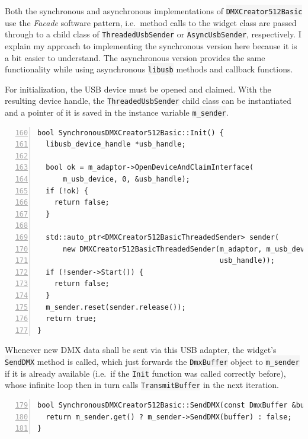 Both the synchronous and asynchronous implementations of
\colorbox{WhiteSmoke}{\lstinline!DMXCreator512Basic!} use the \emph{Facade} software pattern,
i.e.~method calls to the widget class are passed through to a child
class of \colorbox{WhiteSmoke}{\lstinline!ThreadedUsbSender!} or \colorbox{WhiteSmoke}{\lstinline!AsyncUsbSender!},
respectively. I explain my approach to implementing the synchronous
version here because it is a bit easier to understand. The asynchronous
version provides the same functionality while using asynchronous
\colorbox{WhiteSmoke}{\lstinline!libusb!} methods and callback functions.

For initialization, the USB device must be opened and claimed. With the
resulting device handle, the \colorbox{WhiteSmoke}{\lstinline!ThreadedUsbSender!} child class
can be instantiated and a pointer of it is saved in the instance
variable \colorbox{WhiteSmoke}{\lstinline!m_sender!}.

\begin{lstlisting}[numbers=left, style=myCpp, firstnumber=160]
bool SynchronousDMXCreator512Basic::Init() {
  libusb_device_handle *usb_handle;

  bool ok = m_adaptor->OpenDeviceAndClaimInterface(
      m_usb_device, 0, &usb_handle);
  if (!ok) {
    return false;
  }

  std::auto_ptr<DMXCreator512BasicThreadedSender> sender(
      new DMXCreator512BasicThreadedSender(m_adaptor, m_usb_device,
                                           usb_handle));
  if (!sender->Start()) {
    return false;
  }
  m_sender.reset(sender.release());
  return true;
}
\end{lstlisting}

Whenever new DMX data shall be sent via this USB adapter, the widget's
\colorbox{WhiteSmoke}{\lstinline!SendDMX!} method is called, which just forwards the
\colorbox{WhiteSmoke}{\lstinline!DmxBuffer!} object to \colorbox{WhiteSmoke}{\lstinline!m_sender!} if it is already
available (i.e.~if the \colorbox{WhiteSmoke}{\lstinline!Init!} function was called correctly
before), whose infinite loop then in turn calls
\colorbox{WhiteSmoke}{\lstinline!TransmitBuffer!} in the next iteration.

\begin{lstlisting}[numbers=left, style=myCpp, firstnumber=179]
bool SynchronousDMXCreator512Basic::SendDMX(const DmxBuffer &buffer) {
  return m_sender.get() ? m_sender->SendDMX(buffer) : false;
}
\end{lstlisting}

